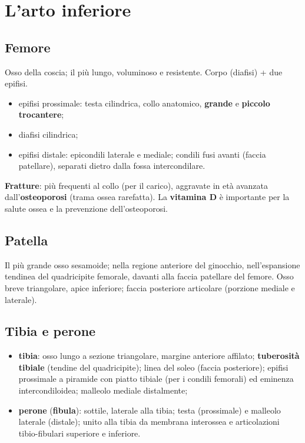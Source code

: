 \section{L'arto inferiore}

\subsection{Femore}
Osso della coscia; il più lungo, voluminoso e resistente. Corpo (diafisi) + due epifisi.
\begin{itemize}
  \item epifisi prossimale: testa cilindrica, collo anatomico, \textbf{grande} e \textbf{piccolo
    trocantere};
  \item diafisi cilindrica;
  \item epifisi distale: epicondili laterale e mediale; condili fusi avanti (faccia patellare),
    separati dietro dalla fossa intercondilare.
\end{itemize}
\textbf{Fratture}: più frequenti al collo (per il carico), aggravate in età avanzata
dall'\textbf{osteoporosi} (trama ossea rarefatta). La \textbf{vitamina D} è importante per la salute
ossea e la prevenzione dell'osteoporosi.

\subsection{Patella}
Il più grande osso sesamoide; nella regione anteriore del ginocchio, nell'espansione tendinea del
quadricipite femorale, davanti alla faccia patellare del femore. Osso breve triangolare, apice
inferiore; faccia posteriore articolare (porzione mediale e laterale).

\subsection{Tibia e perone}
\begin{itemize}
  \item \textbf{tibia}: osso lungo a sezione triangolare, margine anteriore affilato; \textbf{tuberosità
    tibiale} (tendine del quadricipite); linea del soleo (faccia posteriore); epifisi prossimale a
    piramide con piatto tibiale (per i condili femorali) ed eminenza intercondiloidea; malleolo
    mediale distalmente;
  \item \textbf{perone} (\textbf{fibula}): sottile, laterale alla tibia; testa (prossimale) e
    malleolo laterale (distale); unito alla tibia da membrana interossea e articolazioni
    tibio-fibulari superiore e inferiore.
\end{itemize}

